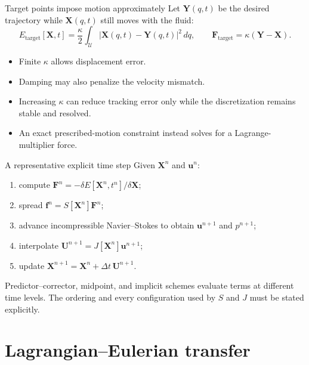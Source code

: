 \documentclass[aspectratio=169,11pt]{beamer}
\newcommand{\uvec}{\bm{u}}
\newcommand{\Xvec}{\bm{X}}
\newcommand{\Uvec}{\bm{U}}
\newcommand{\fvec}{\bm{f}}
\newcommand{\Fvec}{\bm{F}}
\newcommand{\Yvec}{\bm{Y}}
\begin{document}
\begin{frame}{Target points impose motion approximately}
Let \(\Yvec(q,t)\) be the desired trajectory while \(\Xvec(q,t)\) still moves with the fluid:
\[
  E_{\mathrm{target}}[\Xvec,t]
  =
  \frac{\kappa}{2}
  \int_{\mathcal U}
  \lvert\Xvec(q,t)-\Yvec(q,t)\rvert^2\,dq,
  \qquad
  \Fvec_{\mathrm{target}}=\kappa(\Yvec-\Xvec).
\]
\begin{itemize}\itemsep6pt
  \item Finite \(\kappa\) allows displacement error.
  \item Damping may also penalize the velocity mismatch.
  \item Increasing \(\kappa\) can reduce tracking error only while the discretization remains stable and resolved.
  \item An exact prescribed-motion constraint instead solves for a Lagrange-multiplier force.
\end{itemize}
\end{frame}

\begin{frame}{A representative explicit time step}
Given \(\Xvec^n\) and \(\uvec^n\):
\begin{enumerate}\itemsep7pt
  \item compute \(\Fvec^n=-\delta E[\Xvec^n,t^n]/\delta\Xvec\);
  \item spread \(\fvec^n=S[\Xvec^n]\Fvec^n\);
  \item advance incompressible Navier--Stokes to obtain \(\uvec^{n+1}\) and \(p^{n+1}\);
  \item interpolate \(\Uvec^{n+1}=J[\Xvec^n]\uvec^{n+1}\);
  \item update \(\Xvec^{n+1}=\Xvec^n+\Delta t\,\Uvec^{n+1}\).
\end{enumerate}
\begin{punchbox}
\small Predictor--corrector, midpoint, and implicit schemes evaluate terms at different time levels. The ordering and every configuration used by \(S\) and \(J\) must be stated explicitly.
\end{punchbox}
\end{frame}

\section{Lagrangian--Eulerian transfer}
\end{document}
